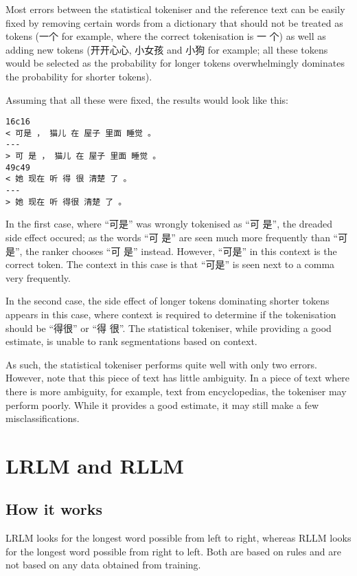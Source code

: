 \documentclass{article}
\begin{document}
Most errors between the statistical tokeniser and the reference text can
be easily fixed by removing certain words from a dictionary that should
not be treated as tokens (一个 for example, where the correct
tokenisation is 一 个) as well as adding new tokens (开开心心, 小女孩
and 小狗 for example; all these tokens would be selected as the
probability for longer tokens overwhelmingly dominates the probability
for shorter tokens).

Assuming that all these were fixed, the results would look like this:

\begin{verbatim}
16c16
< 可是 ， 猫儿 在 屋子 里面 睡觉 。
---
> 可 是 ， 猫儿 在 屋子 里面 睡觉 。
49c49
< 她 现在 听 得 很 清楚 了 。
---
> 她 现在 听 得很 清楚 了 。
\end{verbatim}

In the first case, where ``可是'' was wrongly tokenised as ``可 是'',
the dreaded side effect occured; as the words ``可 是'' are seen much
more frequently than ``可是'', the ranker chooses ``可 是'' instead.
However, ``可是'' in this context is the correct token. The context in
this case is that ``可是'' is seen next to a comma very frequently.

In the second case, the side effect of longer tokens dominating shorter
tokens appears in this case, where context is required to determine if
the tokenisation should be ``得很'' or ``得 很''. The statistical
tokeniser, while providing a good estimate, is unable to rank
segmentations based on context.

As such, the statistical tokeniser performs quite well with only two
errors. However, note that this piece of text has little ambiguity. In a
piece of text where there is more ambiguity, for example, text from
encyclopedias, the tokeniser may perform poorly. While it provides a
good estimate, it may still make a few misclassifications.

\section{LRLM and RLLM}

\subsection{How it works}

LRLM looks for the longest word possible from left to right, whereas
RLLM looks for the longest word possible from right to left. Both are
based on rules and are not based on any data obtained from training.
\end{document}
